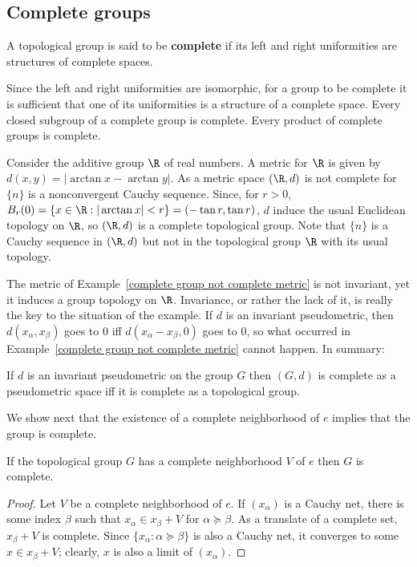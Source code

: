 \subsection{Complete groups}
\begin{definition}
A topological group is said to be \textbf{complete} if its left and right uniformities are structures of complete spaces.
\end{definition}
Since the left and right uniformities are isomorphic, for a group to be complete it is sufficient that one of its uniformities is a structure of a complete space. Every closed subgroup of a complete group is complete. Every product of complete groups is complete.
\begin{example}\label{complete group not complete metric}
Consider the additive group $\R$ of real numbers. A metric for $\R$ is given by $d(x,y)=|\arctan x-\arctan y|$. As a metric space $(\R,d)$ is not complete for $\{n\}$ is a nonconvergent Cauchy sequence. Since, for $r>0$, $B_r(0)=\{x\in\R:|\arctan x|<r\}=(-\tan r,\tan r)$, $d$ induce the usual Euclidean topology on $\R$, so $(\R,d)$ is a complete topological group. Note that $\{n\}$ is a Cauchy sequence in $(\R,d)$ but not in the topological group $\R$ with its usual topology.
\end{example}
The metric of Example~\ref{complete group not complete metric} is not invariant, yet it induces a group topology on $\R$. Invariance, or rather the lack of it, is really the key to the situation of the example. If $d$ is an invariant pseudometric, then $d(x_\alpha,x_\beta)$ goes to $0$ iff $d(x_\alpha-x_\beta,0)$ goes to $0$, so what occurred in Example~\ref{complete group not complete metric} cannot happen. In summary:
\begin{proposition}
If $d$ is an invariant pseudometric on the group $G$ then $(G,d)$ is complete as a pseudometric space iff it is complete as a topological group.
\end{proposition}
We show next that the existence of a complete neighborhood of $e$ implies
that the group is complete.
\begin{proposition}\label{topological group complete nbhd is complete}
If the topological group $G$ has a complete neighborhood $V$ of $e$ then $G$ is complete.
\end{proposition}
\begin{proof}
Let $V$ be a complete neighborhood of $e$. If $(x_\alpha)$ is a Cauchy net, there is some index $\beta$ such that $x_\alpha\in x_\beta+V$ for $\alpha\succeq\beta$. As a translate of a complete set, $x_\beta+V$ is complete. Since $\{x_\alpha:\alpha\succeq\beta\}$ is also a Cauchy net, it converges to some $x\in x_\beta+V$; clearly, $x$ is also a limit of $(x_\alpha)$.
\end{proof}
